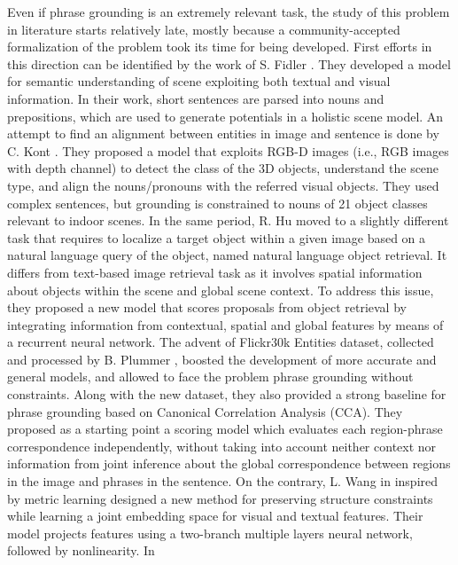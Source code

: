 Even if phrase grounding is an extremely relevant task, the study of
this problem in literature starts relatively late, mostly because a
community-accepted formalization of the problem took its time for
being developed. First efforts in this direction can be identified by
the work of S. Fidler \etal{} \cite{fidler2013sentence}. They
developed a model for semantic understanding of scene exploiting both
textual and visual information. In their work, short sentences are
parsed into nouns and prepositions, which are used to generate
potentials in a holistic scene model. An attempt to find an alignment
between entities in image and sentence is done by C. Kont \etal{}
\cite{kong2014you}. They proposed a model that exploits RGB-D images
(i.e., RGB images with depth channel) to detect the class of the 3D
objects, understand the scene type, and align the nouns/pronouns with
the referred visual objects. They used complex sentences, but
grounding is constrained to nouns of 21 object classes relevant to
indoor scenes. In the same period, R. Hu \etal{} \cite{hu2016natural}
moved to a slightly different task that requires to localize a target
object within a given image based on a natural language query of the
object, named natural language object retrieval. It differs from
text-based image retrieval task as it involves spatial information
about objects within the scene and global scene context. To address
this issue, they proposed a new model that scores proposals from
object retrieval by integrating information from contextual, spatial
and global features by means of a recurrent neural network. The advent
of Flickr30k Entities dataset, collected and processed by B. Plummer
\etal{} \cite{plummer2015flickr30k}, boosted the development of more
accurate and general models, and allowed to face the problem phrase
grounding without constraints. Along with the new dataset, they also
provided a strong baseline for phrase grounding based on Canonical
Correlation Analysis (CCA). They proposed as a starting point a
scoring model which evaluates each region-phrase correspondence
independently, without taking into account neither context nor
information from joint inference about the global correspondence
between regions in the image and phrases in the sentence. On the
contrary, L. Wang \etal{} in \cite{wang2016learning} inspired by
metric learning designed a new method for preserving structure
constraints while learning a joint embedding space for visual and
textual features. Their model projects features using a two-branch
multiple layers neural network, followed by nonlinearity. In

